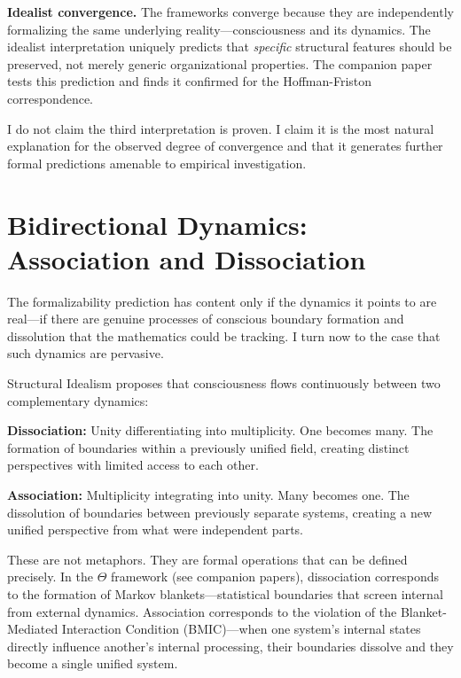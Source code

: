 \documentclass[11pt,a4paper]{article}
\theoremstyle{definition}
\theoremstyle{plain}
\theoremstyle{remark}
\begin{document}
\textbf{Idealist convergence.} The frameworks converge because they are independently formalizing the same underlying reality---consciousness and its dynamics. The idealist interpretation uniquely predicts that \textit{specific} structural features should be preserved, not merely generic organizational properties. The companion paper tests this prediction and finds it confirmed for the Hoffman-Friston correspondence.

I do not claim the third interpretation is proven. I claim it is the most natural explanation for the observed degree of convergence and that it generates further formal predictions amenable to empirical investigation.

\section{Bidirectional Dynamics: Association and Dissociation}\label{sec:dynamics}

The formalizability prediction has content only if the dynamics it points to are real---if there are genuine processes of conscious boundary formation and dissolution that the mathematics could be tracking. I turn now to the case that such dynamics are pervasive.

Structural Idealism proposes that consciousness flows continuously between two complementary dynamics:

\textbf{Dissociation:} Unity differentiating into multiplicity. One becomes many. The formation of boundaries within a previously unified field, creating distinct perspectives with limited access to each other.

\textbf{Association:} Multiplicity integrating into unity. Many becomes one. The dissolution of boundaries between previously separate systems, creating a new unified perspective from what were independent parts.

These are not metaphors. They are formal operations that can be defined precisely. In the $\Theta$ framework (see companion papers), dissociation corresponds to the formation of Markov blankets---statistical boundaries that screen internal from external dynamics. Association corresponds to the violation of the Blanket-Mediated Interaction Condition (BMIC)---when one system's internal states directly influence another's internal processing, their boundaries dissolve and they become a single unified system.
\end{document}
